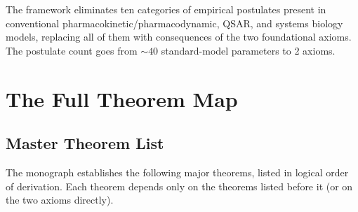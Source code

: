 The framework eliminates ten categories of empirical postulates present in
conventional pharmacokinetic/pharmacodynamic, QSAR, and systems biology models,
replacing all of them with consequences of the two foundational axioms.
The postulate count goes from $\sim 40$ standard-model parameters to 2 axioms.

\section{The Full Theorem Map}
\label{sec:theorem-map}

\subsection{Master Theorem List}

The monograph establishes the following major theorems, listed in logical
order of derivation.  Each theorem depends only on the theorems listed before
it (or on the two axioms directly).

